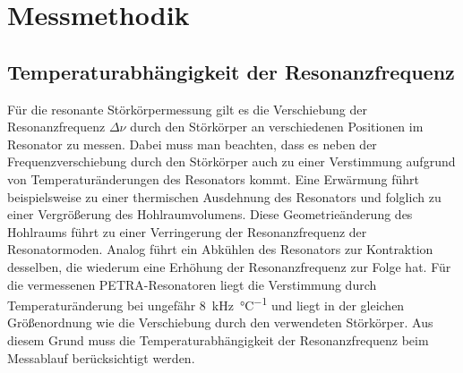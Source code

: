 \section{Messmethodik}
\label{sec:messmethodik}

\subsection{Temperaturabhängigkeit der Resonanzfrequenz}
\label{sec:temperaturabh_resonanzfrequenz}
Für die resonante Störkörpermessung gilt es die Verschiebung der Resonanzfrequenz $\Delta \nu$ durch den Störkörper an verschiedenen Positionen im Resonator zu messen.
Dabei muss man beachten, dass es neben der Frequenzverschiebung durch den Störkörper auch zu einer Verstimmung aufgrund von Temperaturänderungen des Resonators kommt.
Eine Erwärmung führt beispielsweise zu einer thermischen Ausdehnung des Resonators und folglich zu einer Vergrößerung des Hohlraumvolumens.
Diese Geometrieänderung des Hohlraums führt zu einer Verringerung der Resonanzfrequenz der Resonatormoden.
Analog führt ein Abkühlen des Resonators zur Kontraktion desselben, die wiederum eine Erhöhung der Resonanzfrequenz zur Folge hat. Für die vermessenen PETRA-Resonatoren liegt die Verstimmung durch Temperaturänderung bei ungefähr \SI{8}{\kilo\hertz\per\celsius} \cite{desy_petra} und liegt in der gleichen Größenordnung wie die Verschiebung durch den verwendeten Störkörper.
Aus diesem Grund muss die Temperaturabhängigkeit der Resonanzfrequenz beim Messablauf berücksichtigt werden.

